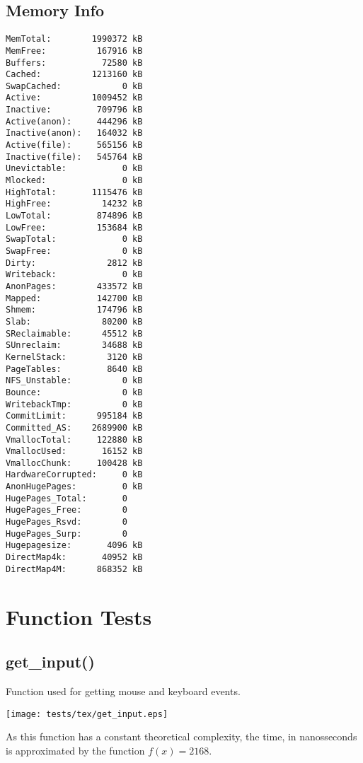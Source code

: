 \documentclass{article}
\begin{document}
\subsection{Memory Info}
\begin{verbatim}
MemTotal:        1990372 kB
MemFree:          167916 kB
Buffers:           72580 kB
Cached:          1213160 kB
SwapCached:            0 kB
Active:          1009452 kB
Inactive:         709796 kB
Active(anon):     444296 kB
Inactive(anon):   164032 kB
Active(file):     565156 kB
Inactive(file):   545764 kB
Unevictable:           0 kB
Mlocked:               0 kB
HighTotal:       1115476 kB
HighFree:          14232 kB
LowTotal:         874896 kB
LowFree:          153684 kB
SwapTotal:             0 kB
SwapFree:              0 kB
Dirty:              2812 kB
Writeback:             0 kB
AnonPages:        433572 kB
Mapped:           142700 kB
Shmem:            174796 kB
Slab:              80200 kB
SReclaimable:      45512 kB
SUnreclaim:        34688 kB
KernelStack:        3120 kB
PageTables:         8640 kB
NFS_Unstable:          0 kB
Bounce:                0 kB
WritebackTmp:          0 kB
CommitLimit:      995184 kB
Committed_AS:    2689900 kB
VmallocTotal:     122880 kB
VmallocUsed:       16152 kB
VmallocChunk:     100428 kB
HardwareCorrupted:     0 kB
AnonHugePages:         0 kB
HugePages_Total:       0
HugePages_Free:        0
HugePages_Rsvd:        0
HugePages_Surp:        0
Hugepagesize:       4096 kB
DirectMap4k:       40952 kB
DirectMap4M:      868352 kB
\end{verbatim}
\section{Function Tests}
\subsection{get\_input()}
Function used for getting mouse and keyboard events.


\texttt{[image: tests/tex/get\_input.eps]}

As this function has a constant theoretical
complexity, the time, in nanosseconds is 
approximated by the function $f(x)=2168$.
\end{document}
